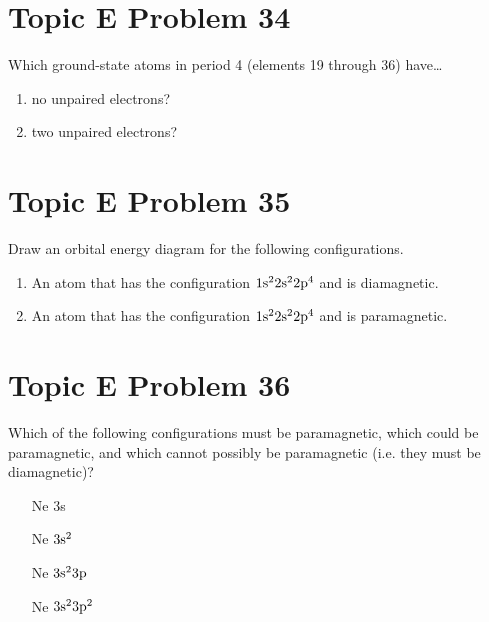 \documentclass[10pt]{article}
\begin{document}
    \pagebreak
    \section{Topic E Problem 34}
        Which ground-state atoms in period 4 (elements 19 through 36) have…
        \begin{enumerate}[label=\alph*)]
            \item   no unpaired electrons?
            \item   two unpaired electrons?
        \end{enumerate}


    \pagebreak
    \section{Topic E Problem 35}
        Draw an orbital energy diagram for the following configurations.
        \begin{enumerate}
            \item   An atom that has the configuration $\rm 1s^2 2s^2 2p^4$ and is diamagnetic.
            \item   An atom that has the configuration $\rm 1s^2 2s^2 2p^4$ and is paramagnetic.
        \end{enumerate}

    \pagebreak
    \section{Topic E Problem 36}
        Which of the following configurations must be paramagnetic, which could be paramagnetic, and which cannot possibly be paramagnetic (i.e. they must be diamagnetic)?
        \begin{enumerate}[label=\alph*)]
            \item   [Ne]3s
            \item   [Ne]$\rm 3s^2$
            \item   [Ne]$\rm 3s^2 3p$
            \item   [Ne]$\rm 3s^2 3p^2$
        \end{enumerate}


    \pagebreak
\end{document}
